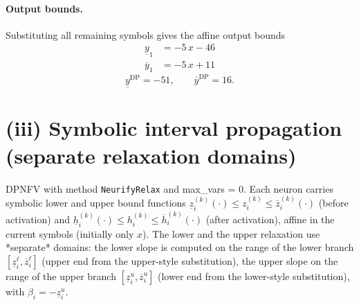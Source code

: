 \documentclass[11pt]{article}
\begin{document}
\paragraph{Output bounds.}
Substituting all remaining symbols gives the affine output bounds
\begin{align*}
\underline{y}_{1} &= -5\,x - 46
\end{align*}
\begin{align*}
\overline{y}_{1} &= -5\,x + 11
\end{align*}
\begin{equation*}
\underline{y}^{\text{DP}} = -51, \qquad \overline{y}^{\text{DP}} = 16.
\end{equation*}

\section{(iii) Symbolic interval propagation (separate relaxation domains)}
DPNFV with method \texttt{NeurifyRelax} and max\_vars = 0. Each neuron carries symbolic lower and upper bound functions
$\underline{z}^{(k)}_i(\cdot) \le z^{(k)}_i \le \overline{z}^{(k)}_i(\cdot)$ (before activation)
and $\underline{h}^{(k)}_i(\cdot) \le h^{(k)}_i \le \overline{h}^{(k)}_i(\cdot)$ (after activation),
affine in the current symbols (initially only $x$).
The lower and the upper relaxation use *separate* domains:
the lower slope is computed on the range of the lower branch
$[\underline{z}^{\ell}_i, \overline{z}^{\ell}_i]$ (upper end from the upper-style substitution),
the upper slope on the range of the upper branch
$[\underline{z}^{u}_i, \overline{z}^{u}_i]$ (lower end from the lower-style substitution),
with $\beta_i = -\underline{z}^{u}_i$.
\end{document}
